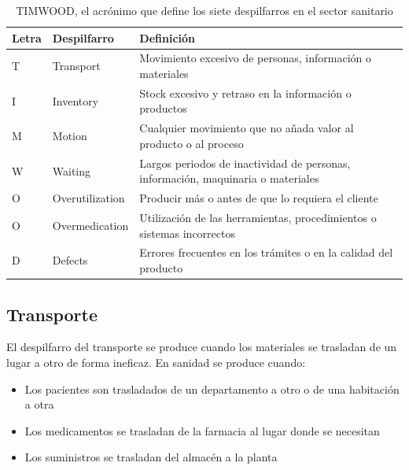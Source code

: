 \begin{table}
    \centering
    \begin{tabular}{llp{10cm}}
        \toprule
        Letra & Despilfarro     & Definición                                                                         \\
        \midrule
        T     & Transport       & Movimiento excesivo de personas, información o materiales                          \\
        I     & Inventory       & Stock excesivo y retraso en la información o productos                             \\
        M     & Motion          & Cualquier movimiento que no añada valor al producto o al proceso                   \\
        W     & Waiting         & Largos periodos de inactividad de personas, información, maquinaria o   materiales \\
        O     & Overutilization & Producir más o antes de que lo requiera el cliente                                 \\
        O     & Overmedication  & Utilización de las herramientas, procedimientos o sistemas incorrectos             \\
        D     & Defects         & Errores frecuentes en los trámites o en la calidad del producto                    \\
        \bottomrule
    \end{tabular}
    \caption{TIMWOOD, el acrónimo que define los siete despilfarros en el sector sanitario}
    \label{tab:timwood}
\end{table}

\subsection{Transporte}

El despilfarro del transporte se produce cuando los materiales se trasladan de un lugar a otro de forma ineficaz. En sanidad se produce cuando:

\begin{itemize}
    \item Los pacientes son trasladados de un departamento a otro o de una habitación a otra
    \item Los medicamentos se trasladan de la farmacia al lugar donde se necesitan
    \item Los suministros se trasladan del almacén a la planta
\end{itemize}

